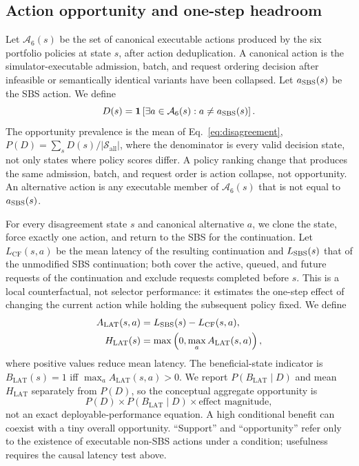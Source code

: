 \documentclass[preprint,12pt]{elsarticle}
\begin{document}
\subsection{Action opportunity and one-step headroom}
\label{sec:actions}
Let $\mathcal{A}_6(s)$ be the set of canonical executable actions produced by
the six portfolio policies at state $s$, after action deduplication. A
canonical action is the simulator-executable admission, batch, and request
ordering decision after infeasible or semantically identical variants have
been collapsed. Let $a_{\mathrm{SBS}}(s)$ be the SBS action. We define
\begin{equation}
  D(s) = \mathbf{1}\left[\exists a\in\mathcal{A}_6(s):
  a\ne a_{\mathrm{SBS}}(s)\right].
  \label{eq:disagreement}
\end{equation}
The opportunity prevalence is the mean of Eq.~\ref{eq:disagreement},
$P(D)=\sum_sD(s)/|\mathcal{S}_{\mathrm{all}}|$,
where the denominator is every valid decision state, not only states where
policy scores differ. A policy ranking change that produces the same admission,
batch, and request order is action collapse, not opportunity. An alternative
action is any executable member of $\mathcal{A}_6(s)$ that is not equal to
$a_{\mathrm{SBS}}(s)$.

For every disagreement state $s$ and canonical alternative $a$, we clone the
state, force exactly one action, and return to the SBS for the continuation.
Let $L_{\mathrm{CF}}(s,a)$ be the mean latency of the resulting continuation and
$L_{\mathrm{SBS}}(s)$ that of the unmodified SBS continuation; both cover the active,
queued, and future requests of the continuation and exclude requests completed
before $s$. This is a local counterfactual, not selector performance: it
estimates the one-step effect of changing the current action while holding the
subsequent policy fixed. We define
\begin{equation}
 \begin{aligned}
 A_{\mathrm{LAT}}(s,a)&=L_{\mathrm{SBS}}(s)-L_{\mathrm{CF}}(s,a),\\
 H_{\mathrm{LAT}}(s)&=\max\left(0,\max_aA_{\mathrm{LAT}}(s,a)\right),
 \end{aligned}
 \label{eq:latency}
\end{equation}
where positive values reduce mean latency. The beneficial-state indicator is
$B_{\mathrm{LAT}}(s)=1$ iff $\max_aA_{\mathrm{LAT}}(s,a)>0$. We report
$P(B_{\mathrm{LAT}}\mid D)$ and mean $H_{\mathrm{LAT}}$ separately from $P(D)$,
so the conceptual aggregate opportunity is
\begin{equation}
 P(D)\times P(B_{\mathrm{LAT}}\mid D)\times
 \text{effect magnitude},
 \label{eq:decomposition}
\end{equation}
not an exact deployable-performance equation. A high conditional benefit can
coexist with a tiny overall opportunity. ``Support'' and ``opportunity'' refer
only to the existence of executable non-SBS actions under a condition;
usefulness requires the causal latency test above.
\end{document}
